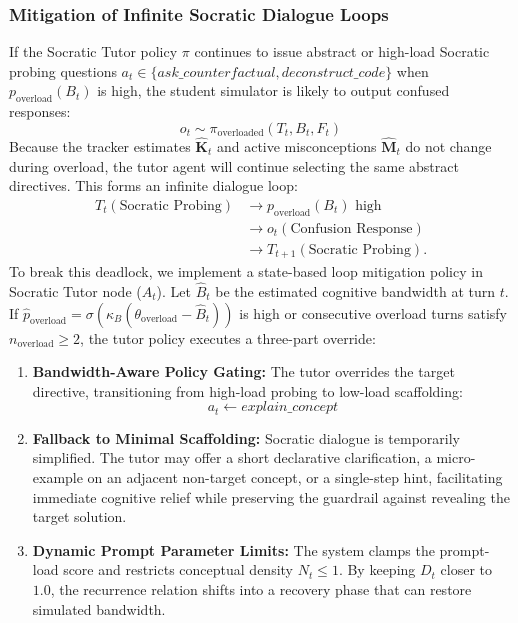 \documentclass[11pt,a4paper]{report}
\begin{document}
\subsubsection{Mitigation of Infinite Socratic Dialogue Loops}
If the Socratic Tutor policy $\pi$ continues to issue abstract or high-load Socratic probing questions $a_t \in \{\textit{ask\_counterfactual}, \textit{deconstruct\_code}\}$ when $p_{\text{overload}}(B_t)$ is high, the student simulator is likely to output confused responses:
\begin{equation}
    o_t \sim \pi_{\text{overloaded}}(T_t, B_t, F_t)
\end{equation}
Because the tracker estimates $\hat{\mathbf{K}}_t$ and active misconceptions $\hat{\mathbf{M}}_t$ do not change during overload, the tutor agent will continue selecting the same abstract directives. This forms an infinite dialogue loop:
\begin{equation}
    \begin{aligned}
    T_t (\text{Socratic Probing})
    &\longrightarrow p_{\text{overload}}(B_t)\text{ high}\\
    &\longrightarrow o_t (\text{Confusion Response})\\
    &\longrightarrow T_{t+1} (\text{Socratic Probing}).
    \end{aligned}
\end{equation}
To break this deadlock, we implement a state-based loop mitigation policy in Socratic Tutor node ($A_t$). Let $\hat{B}_t$ be the estimated cognitive bandwidth at turn $t$. If $\hat{p}_{\text{overload}}=\sigma(\kappa_B(\theta_{\text{overload}}-\hat{B}_t))$ is high or consecutive overload turns satisfy $n_{\text{overload}}\ge2$, the tutor policy executes a three-part override:
\begin{enumerate}
    \item \textbf{Bandwidth-Aware Policy Gating:} The tutor overrides the target directive, transitioning from high-load probing to low-load scaffolding:
    \begin{equation}
        a_t \gets \textit{explain\_concept}
    \end{equation}
    \item \textbf{Fallback to Minimal Scaffolding:} Socratic dialogue is temporarily simplified. The tutor may offer a short declarative clarification, a micro-example on an adjacent non-target concept, or a single-step hint, facilitating immediate cognitive relief while preserving the guardrail against revealing the target solution.
    \item \textbf{Dynamic Prompt Parameter Limits:} The system clamps the prompt-load score and restricts conceptual density $N_t \le 1$. By keeping $D_t$ closer to $1.0$, the recurrence relation shifts into a recovery phase that can restore simulated bandwidth.
\end{enumerate}
\end{document}
